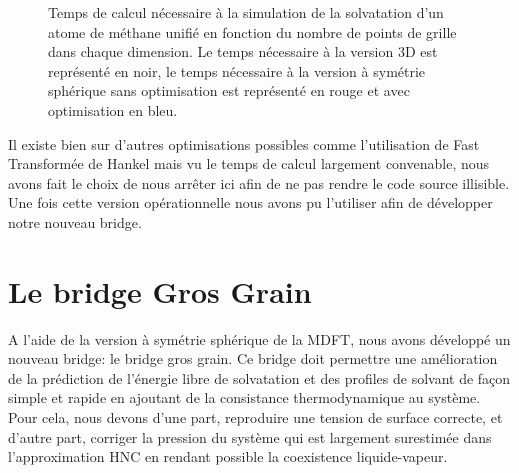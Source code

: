 \begin{figure}[H]
  \centering
  \caption[Temps de calcul nécessaire à la simulation de la solvatation d'un atome de méthane unifié.]{Temps de calcul nécessaire à la simulation de la solvatation d'un atome de méthane unifié en fonction du nombre de points de grille dans chaque dimension. Le temps nécessaire à la version 3D est représenté en noir, le temps nécessaire à la version à symétrie sphérique sans optimisation est représenté en rouge et avec optimisation en bleu.}
  \label{fig:temps_calcul_methane_versions}
\end{figure}

Il existe bien sur d'autres optimisations possibles comme l'utilisation de Fast Transformée de Hankel mais vu le temps de calcul largement convenable, nous avons fait le choix de nous arrêter ici afin de ne pas rendre le code source illisible. Une fois cette version opérationnelle nous avons pu l'utiliser afin de développer notre nouveau bridge.



\section{Le bridge Gros Grain}
A l'aide de la version à symétrie sphérique de la MDFT, nous avons développé un nouveau bridge: le bridge gros grain. Ce bridge doit permettre une amélioration de la prédiction de l'énergie libre de solvatation et des profiles de solvant de façon simple et rapide en ajoutant de la consistance thermodynamique au système. Pour cela, nous devons d'une part, reproduire une tension de surface correcte, et d'autre part, corriger la pression du système qui est largement surestimée dans l'approximation HNC en rendant possible la coexistence liquide-vapeur. 

